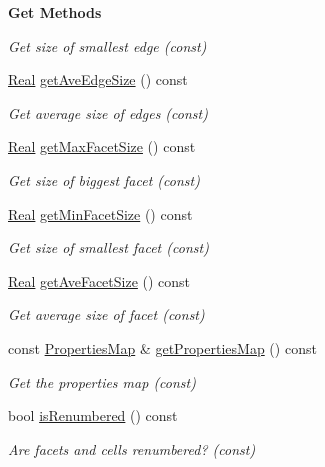 \begin{Indent}{\bf Get Methods}
\begin{DoxyCompactItemize}
\begin{DoxyCompactList}\small\item\em Get size of smallest edge (const) \end{DoxyCompactList}\item 
\hyperlink{namespaceFVCode3D_a40c1f5588a248569d80aa5f867080e83}{Real} \hyperlink{classFVCode3D_1_1Rigid__Mesh_a55d65366017440b6a5e54e292d5ba1fe}{get\+Ave\+Edge\+Size} () const 
\begin{DoxyCompactList}\small\item\em Get average size of edges (const) \end{DoxyCompactList}\item 
\hyperlink{namespaceFVCode3D_a40c1f5588a248569d80aa5f867080e83}{Real} \hyperlink{classFVCode3D_1_1Rigid__Mesh_a820684a23b7c0d4e4a1ae2491466a3f3}{get\+Max\+Facet\+Size} () const 
\begin{DoxyCompactList}\small\item\em Get size of biggest facet (const) \end{DoxyCompactList}\item 
\hyperlink{namespaceFVCode3D_a40c1f5588a248569d80aa5f867080e83}{Real} \hyperlink{classFVCode3D_1_1Rigid__Mesh_a8ce3f2dabfd2948cb1f6f3a6d150c506}{get\+Min\+Facet\+Size} () const 
\begin{DoxyCompactList}\small\item\em Get size of smallest facet (const) \end{DoxyCompactList}\item 
\hyperlink{namespaceFVCode3D_a40c1f5588a248569d80aa5f867080e83}{Real} \hyperlink{classFVCode3D_1_1Rigid__Mesh_aa9a1e456a09a1765f9fa038896a597ce}{get\+Ave\+Facet\+Size} () const 
\begin{DoxyCompactList}\small\item\em Get average size of facet (const) \end{DoxyCompactList}\item 
const \hyperlink{classFVCode3D_1_1PropertiesMap}{Properties\+Map} \& \hyperlink{classFVCode3D_1_1Rigid__Mesh_ab6e52fa6193e5db83fe7ccbb1c3737e8}{get\+Properties\+Map} () const 
\begin{DoxyCompactList}\small\item\em Get the properties map (const) \end{DoxyCompactList}\item 
bool \hyperlink{classFVCode3D_1_1Rigid__Mesh_a845d1684e535cded4e128ca116ab90e9}{is\+Renumbered} () const 
\begin{DoxyCompactList}\small\item\em Are facets and cells renumbered? (const) \end{DoxyCompactList}\end{DoxyCompactItemize}
\end{Indent}
